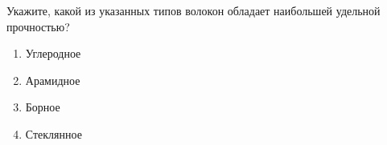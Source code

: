 
Укажите, какой из указанных типов волокон обладает наибольшей удельной прочностью?

\begin{enumerate}
    \item Углеродное
    \item Арамидное
    \item Борное
    \item Стеклянное
\end{enumerate}